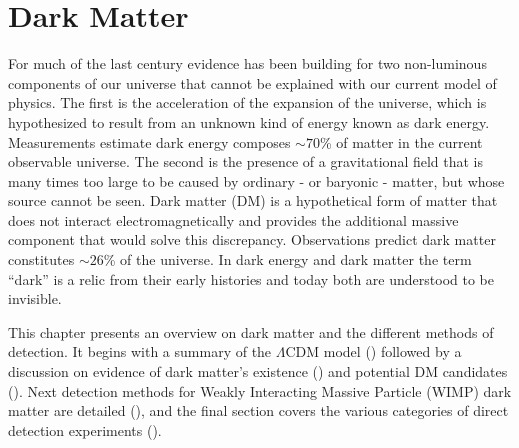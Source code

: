 




\pagestyle{cu}
\graphicspath{{./Chapter1/Figures/}}
\chapter[Dark Matter][Dark Matter]{Dark Matter}
\label{chap:dark_matter}

For much of the last century evidence has been building for two non-luminous components of our universe that cannot be explained with
our current model of physics.  The first is the acceleration of the expansion of the universe, which is hypothesized to result from an
unknown kind of energy known as dark energy.  Measurements estimate dark energy composes ${\sim}70$\% of
matter in the current observable universe.  The second is the presence of a gravitational field that is many times too large to be caused
by ordinary - or baryonic - matter, but whose source cannot be seen.  Dark matter (DM) is a hypothetical form of matter that does not
interact
electromagnetically and provides the additional massive component that would solve this discrepancy.  Observations predict dark matter
constitutes ${\sim}26$\% of the universe.  In dark energy and dark matter the term ``dark'' is a relic from their early histories and
today both are understood to be invisible.

This chapter presents an overview on dark matter and the different methods of detection.  It begins with a summary of the
$\Lambda \mathrm{CDM}$ model () followed by a discussion on evidence of dark matter's existence
() and potential DM candidates ().  Next detection methods for Weakly
Interacting Massive Particle (WIMP) dark matter are detailed (), and the final section covers the various
categories of direct detection experiments ().



